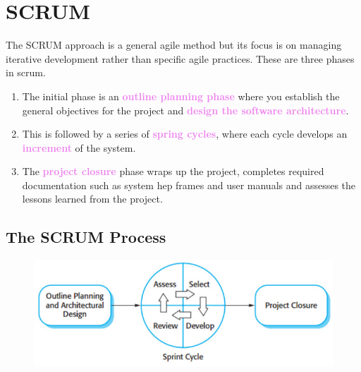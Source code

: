 \documentclass{report}
\newcommand{\textv}[1]{\textcolor{violet}{#1}}
\newcommand{\textbfv}[1]{\textbf{\textv{#1}}}
\begin{document}
\section{SCRUM}
\noindent The SCRUM approach is a general agile method but its focus is on managing iterative development rather than specific agile practices. These are three phases in scrum.
\begin{multicols}{2}
\begin{enumerate}
  \item The initial phase is an \textbfv{outline planning phase} where you establish the general objectives for the project and \textbfv{design the software architecture}.
  \item This is followed by a series of \textbfv{spring cycles}, where each cycle develops an \textbfv{increment} of the system.
  \item The \textbfv{project closure} phase wraps up the project, completes required documentation such as system hep frames and user manuals and assesses the lessons learned from the project.
\end{enumerate}

\subsection{The SCRUM Process}
\begin{figure}[H]
\centering
\includegraphics[scale=.4,trim=1cm 1cm 1cm 1cm]{assets/CEN4010_Scrum_Process.jpg}
\end{figure}
\end{multicols}
\end{document}
